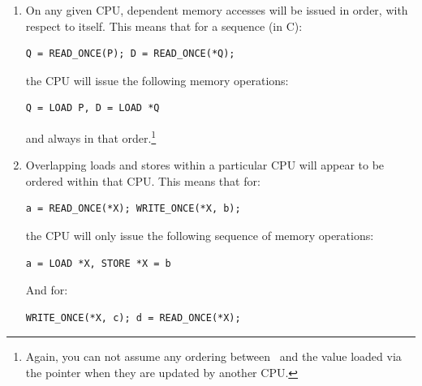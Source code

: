 \begin{enumerate}
\item	On any given CPU, dependent memory accesses will be issued in order,
	with respect to itself.  This means that for a sequence (in C):

\begin{minipage}[t]{\columnwidth}
\scriptsize
\begin{verbatim}
Q = READ_ONCE(P); D = READ_ONCE(*Q);
\end{verbatim}
\end{minipage}

	the CPU will issue the following memory operations:

\begin{minipage}[t]{\columnwidth}
\scriptsize
\begin{verbatim}
Q = LOAD P, D = LOAD *Q
\end{verbatim}
\end{minipage}

	and always in that order.\footnote{Again, you can not assume
		any ordering between~ and the value loaded via
		the pointer when they are updated by another CPU.}

\item	Overlapping loads and stores within a particular CPU will appear to be
	ordered within that CPU.  This means that for:

\begin{minipage}[t]{\columnwidth}
\scriptsize
\begin{verbatim}
a = READ_ONCE(*X); WRITE_ONCE(*X, b);
\end{verbatim}
\end{minipage}

	the CPU will only issue the following sequence of memory operations:

\begin{minipage}[t]{\columnwidth}
\scriptsize
\begin{verbatim}
a = LOAD *X, STORE *X = b
\end{verbatim}
\vspace{1pt}
\end{minipage}

	And for:

\begin{minipage}[t]{\columnwidth}
\scriptsize
\begin{verbatim}
WRITE_ONCE(*X, c); d = READ_ONCE(*X);
\end{verbatim}
\end{minipage}


\end{enumerate}
